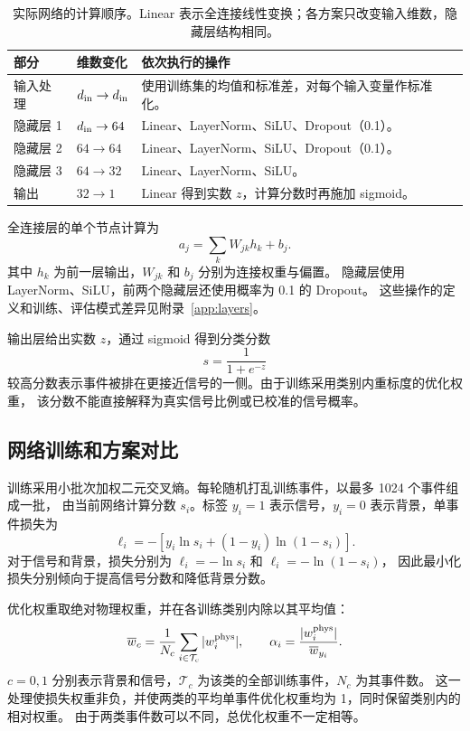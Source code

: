 \documentclass[11pt,a4paper,fontset=fandol,scheme=plain]{ctexart}
\begin{document}
\begin{table}[H]
\caption{实际网络的计算顺序。Linear 表示全连接线性变换；各方案只改变输入维数，隐藏层结构相同。}
\label{tab:network}
\centering\small
\begin{tabularx}{\linewidth}{@{}p{.15\linewidth}p{.18\linewidth}Y@{}}
\toprule
部分 & 维数变化 & 依次执行的操作 \\
\midrule
输入处理 & $d_{\rm in}\to d_{\rm in}$ & 使用训练集的均值和标准差，对每个输入变量作标准化。 \\
隐藏层 1 & $d_{\rm in}\to64$ & Linear、LayerNorm、SiLU、Dropout（0.1）。 \\
隐藏层 2 & $64\to64$ & Linear、LayerNorm、SiLU、Dropout（0.1）。 \\
隐藏层 3 & $64\to32$ & Linear、LayerNorm、SiLU。 \\
输出 & $32\to1$ & Linear 得到实数 $z$，计算分数时再施加 sigmoid。 \\
\bottomrule
\end{tabularx}
\end{table}

全连接层的单个节点计算为
\[
 a_j=\sum_k W_{jk}h_k+b_j.
\]
其中 $h_k$ 为前一层输出，$W_{jk}$ 和 $b_j$ 分别为连接权重与偏置。
隐藏层使用 LayerNorm、SiLU，前两个隐藏层还使用概率为 0.1 的 Dropout。
这些操作的定义和训练、评估模式差异见附录~\ref{app:layers}。

输出层给出实数 $z$，通过 sigmoid 得到分类分数
\[
 s=\frac{1}{1+e^{-z}}
\]
较高分数表示事件被排在更接近信号的一侧。由于训练采用类别内重标度的优化权重，
该分数不能直接解释为真实信号比例或已校准的信号概率。


\subsection{网络训练和方案对比}

训练采用小批次加权二元交叉熵。每轮随机打乱训练事件，以最多 1024 个事件组成一批，
由当前网络计算分数 $s_i$。标签 $y_i=1$ 表示信号，$y_i=0$ 表示背景，单事件损失为
\[
 \ell_i=-\left[y_i\ln s_i+(1-y_i)\ln(1-s_i)\right].
\]
对于信号和背景，损失分别为 $\ell_i=-\ln s_i$ 和 $\ell_i=-\ln(1-s_i)$，
因此最小化损失分别倾向于提高信号分数和降低背景分数。

优化权重取绝对物理权重，并在各训练类别内除以其平均值：
\[
 \overline w_c=\frac{1}{N_c}\sum_{i\in\mathcal T_c}|w_i^{\rm phys}|,
 \qquad
 \alpha_i=\frac{|w_i^{\rm phys}|}{\overline w_{y_i}}.
\]
$c=0,1$ 分别表示背景和信号，$\mathcal T_c$ 为该类的全部训练事件，$N_c$ 为其事件数。
这一处理使损失权重非负，并使两类的平均单事件优化权重均为 1，同时保留类别内的相对权重。
由于两类事件数可以不同，总优化权重不一定相等。
\end{document}
